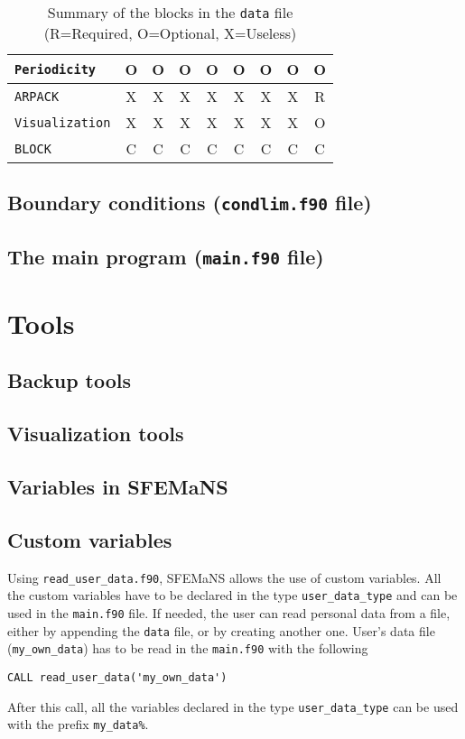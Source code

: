 \documentclass{book}
\makeatletter
\newcommand{\sfemans}{SFEMaNS\@\xspace}\newcommand{\petsc}{PETSc\@\xspace}
\makeatother
\begin{document}
\begin{table}[h]
\begin{tabular}{|l|cccccccc|}
\texttt{Periodicity}                   & O & O & O & O & O & O & O & O\\ \hline
\texttt{ARPACK}                        & X & X & X & X & X & X & X & R\\ \hline
\texttt{Visualization}                 & X & X & X & X & X & X & X & O\\ \hline
\texttt{BLOCK}                         & C & C & C & C & C & C & C & C\\ \hline
\end{tabular}
\caption{Summary of the blocks in the \texttt{data} file (R=Required, O=Optional, X=Useless)}
\label{tab:data_blocks}
\end{table}

\section{Boundary conditions (\texttt{condlim.f90} file)}

\section{The main program (\texttt{main.f90} file)}

\chapter{Tools}
\section{Backup tools}
\section{Visualization tools}
\section{Variables in \sfemans}
\section{Custom variables}
Using \texttt{read\_user\_data.f90}, \sfemans allows the use of custom
variables. All the custom variables have to be declared in the type
\texttt{user\_data\_type} and can be used in the \texttt{main.f90}
file. If needed, the user can read personal data from a file, either
by appending the \texttt{data} file, or by creating another
one. User's data file (\eg \texttt{my\_own\_data}) has to be read in
the \texttt{main.f90} with the following
\begin{verbatim}
CALL read_user_data('my_own_data')
\end{verbatim}
After this call, all the variables declared in the type \texttt{user\_data\_type} can be used with the prefix \verb?my_data%?.
\end{document}
